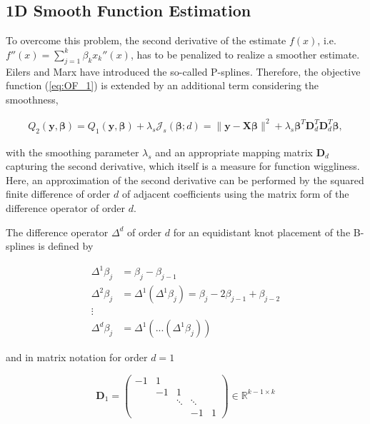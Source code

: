 \documentclass[10pt,a4paper]{article}
\begin{document}
	\subsection{1D Smooth Function Estimation} \label{1D_smooth}

	To overcome this problem, the second derivative of the estimate $f(x)$, i.e. $f''(x) = \sum_{j=1}^k \beta_k x_k''(x)$, has to be penalized to realize a smoother estimate. Eilers and Marx have introduced the so-called P-splines. \cite{eilers1996flexible} Therefore, the objective function (\ref{eq:OF_1}) is extended by an additional term considering the smoothness, 
	
	\begin{align}\label{eq:OF_2}
		Q_2(\boldsymbol{y}, \boldsymbol{\beta}) = Q_1(\boldsymbol{y}, \boldsymbol{\beta}) + \lambda_s \mathcal{J}_s(\boldsymbol{\beta}; d) = \lVert \boldsymbol{y} - \boldsymbol{X} \boldsymbol{\beta} \rVert^2 + \lambda_s \boldsymbol{\beta}^T \boldsymbol{D}_d^T \boldsymbol{D}_d^T \boldsymbol{\beta}, 
	\end{align}
	
	with the smoothing parameter $\lambda_s$ and an appropriate mapping matrix $\boldsymbol{D}_d$ capturing the second derivative, which itself is a measure for function wiggliness. Here, an approximation of the second derivative can be performed by the squared finite difference of order $d$ of adjacent coefficients using the matrix form of the difference operator of order $d$. 
	
	The difference operator  $\Delta^d$ of order $d$ for an equidistant knot placement of the B-splines is defined by
	
	\begin{align*}
		\Delta^1 \beta_j &= \beta_j - \beta_{j-1} \\
		\Delta^2 \beta_j &= \Delta^1(\Delta^1 \beta_j) = \beta_j - 2\beta_{j-1} + \beta_{j-2} \\ 
	  	\vdots \\ 
	  	\Delta^d \beta_j &= \Delta^1(...(\Delta^1 \beta_j))
	\end{align*}
	
	and in matrix notation for order $d=1$
	
	$$\boldsymbol{D}_1 = 
			\begin{pmatrix} 
					-1& 1&       &        &   \\  
					  &-1& 1     &        &   \\  
					  &  &\ddots & \ddots &   \\ 
					  &  &       & -1     & 1 
			\end{pmatrix} \in \mathbb R^{k-1\times k}$$
	
\end{document}

